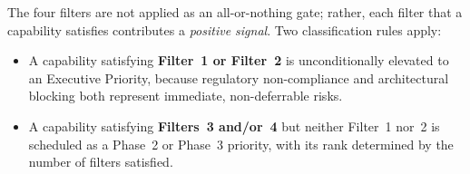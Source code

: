 \documentclass{ieeeaccess}
\begin{document}
The four filters are not applied as an all-or-nothing gate; rather, each
filter that a capability satisfies contributes a \emph{positive signal}.
Two classification rules apply:

\begin{itemize}
    \item A capability satisfying \textbf{Filter~1 or Filter~2} is
    unconditionally elevated to an Executive Priority, because regulatory
    non-compliance and architectural blocking both represent immediate,
    non-deferrable risks.
    \item A capability satisfying \textbf{Filters~3 and/or~4} but neither
    Filter~1 nor~2 is scheduled as a Phase~2 or Phase~3 priority, with its
    rank determined by the number of filters satisfied.
\end{itemize}
\end{document}
